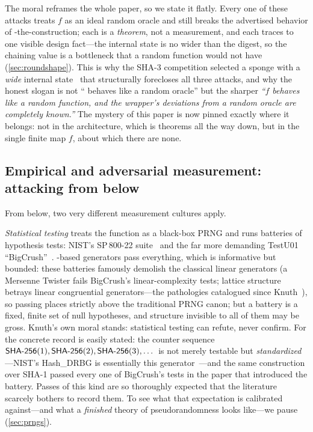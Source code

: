 The moral reframes the whole paper, so we state it flatly. Every one of
these attacks treats $f$ as an ideal random oracle and still breaks the
advertised behavior of \SHA{}-the-construction; each is a
\emph{theorem}, not a measurement, and each traces to one visible
design fact---the internal state is no wider than the digest, so the
chaining value is a bottleneck that a random function would not have
(\cref{sec:roundshape}). This is why the SHA-3 competition selected a
sponge with a \emph{wide} internal
state~\citep{BDPV2007} that structurally forecloses all three attacks,
and why the
honest slogan is not ``\SHA{} behaves like a random oracle'' but the
sharper \emph{``$f$ behaves like a random function, and the wrapper's
deviations from a random oracle are completely known.''} The mystery of
this paper is now pinned exactly where it belongs: not in the
architecture, which is theorems all the way down, but in the single
finite map $f$, about which there are none.

\subsection{Empirical and adversarial measurement: attacking from below}
\label{sec:below}

From below, two very different measurement cultures apply.

\emph{Statistical testing} treats the function as a black-box PRNG and
runs batteries of hypothesis tests: NIST's SP\,800-22
suite~\citep{NIST2010} and the far more demanding TestU01
``BigCrush''~\citep{LEcuyerSimard2007}. \SHA{}-based generators pass
everything, which is informative but bounded: these batteries famously
demolish the classical linear generators (a Mersenne Twister fails
BigCrush's linear-complexity tests; lattice structure betrays linear
congruential generators---the pathologies catalogued since
Knuth~\citep{Knuth1997}), so passing places \SHA{} strictly above the
traditional PRNG canon; but a battery is a fixed, finite set of null
hypotheses, and structure invisible to all of them may be gross. Knuth's
own moral stands: statistical testing can refute, never confirm. For
\SHA{} the concrete record is easily stated: the counter sequence
$\textsf{SHA-256}(1), \textsf{SHA-256}(2), \textsf{SHA-256}(3), \dots$ is not merely testable but
\emph{standardized}---NIST's Hash\_DRBG is essentially this
generator~\citep{SP80090A}---and the same construction over SHA-1
passed every one of BigCrush's tests in the paper that introduced the
battery. Passes of this kind are so thoroughly expected that the
literature scarcely bothers to record them. To see what that
expectation is calibrated against---and what a \emph{finished} theory
of pseudorandomness looks like---we pause (\cref{sec:prngs}).

